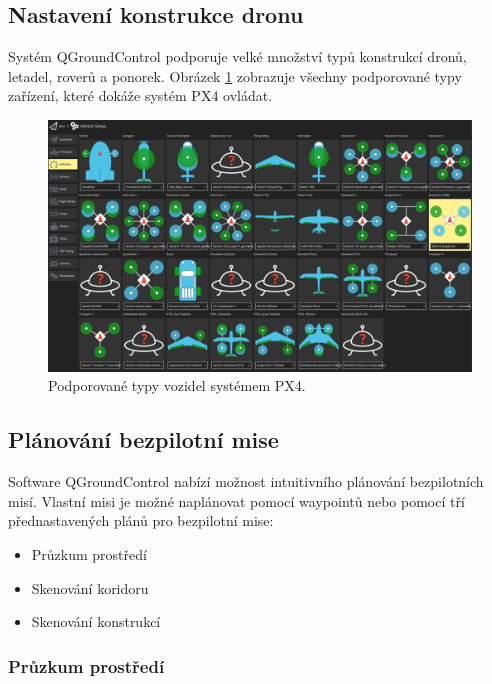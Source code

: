 \subsection{Nastavení konstrukce dronu}

Systém QGroundControl podporuje velké množství typů konstrukcí dronů, letadel, roverů a ponorek. Obrázek \ref{fig:QGC1} zobrazuje všechny podporované typy zařízení, které dokáže systém PX4 ovládat.

\begin{figure}[!ht]
    \begin{center}
        \includegraphics[scale=0.3]{obrazky/QG2}
    \end{center}
    \caption[Podporované typy vozidel systémem PX4]{Podporované typy vozidel systémem PX4.}
    \label{fig:QGC1}
\end{figure}

\subsection{Plánování bezpilotní mise}
\label{subs:planovani}

Software QGroundControl nabízí možnost intuitivního plánování bezpilotních misí. Vlastní misi je možné naplánovat pomocí waypointů nebo pomocí tří přednastavených plánů pro bezpilotní mise: \cite{QGround2}

\begin{itemize}
    \item Průzkum prostředí
    \item Skenování koridoru
    \item Skenování konstrukcí
\end{itemize}

\subsubsection{Průzkum prostředí}

